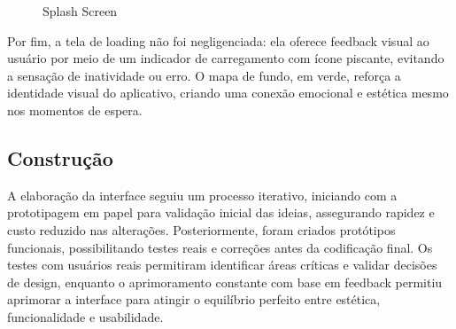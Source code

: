 \documentclass[a4paper, 12pt]{article}
\begin{document}
\begin{figure}[H]
  \centering
  \caption{Splash Screen}
  \label{fig:loading}
\end{figure}

Por fim, a tela de loading não foi negligenciada: ela oferece feedback visual ao usuário por meio de um indicador de carregamento com ícone piscante, evitando a sensação de inatividade ou erro. O mapa de fundo, em verde, reforça a identidade visual do aplicativo, criando uma conexão emocional e estética mesmo nos momentos de espera.

\subsection{Construção}

A elaboração da interface seguiu um processo iterativo, iniciando com a prototipagem em papel para validação inicial das ideias, assegurando rapidez e custo reduzido nas alterações. Posteriormente, foram criados protótipos funcionais, possibilitando testes reais e correções antes da codificação final. Os testes com usuários reais permitiram identificar áreas críticas e validar decisões de design, enquanto o aprimoramento constante com base em feedback permitiu aprimorar a interface para atingir o equilíbrio perfeito entre estética, funcionalidade e usabilidade.
\end{document}
